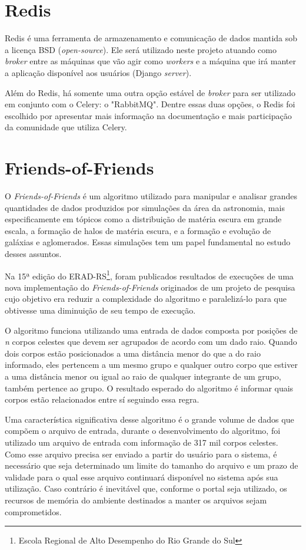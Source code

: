 \documentclass[tg]{mdtufsm}
\begin{document}
\section{Redis}
Redis \cite{redis} é uma ferramenta de armazenamento e comunicação de dados mantida sob a licença BSD (\emph{open-source}). Ele será utilizado neste projeto atuando como \emph{broker} entre as máquinas que vão agir como \emph{workers} e a máquina que irá manter a aplicação disponível aos usuários (Django \emph{server}). 

Além do Redis, há somente uma outra opção estável de \emph{broker} para ser utilizado em conjunto com o Celery: o "RabbitMQ". Dentre essas duas opções, o Redis foi escolhido por apresentar mais informação na documentação e mais participação da comunidade que utiliza Celery.

\section{Friends-of-Friends}
O \emph{Friends-of-Friends} \cite{friendsalg} é um algoritmo utilizado para manipular e analisar grandes quantidades de dados produzidos por simulações da área da astronomia, mais especificamente em tópicos como a distribuição de matéria escura em grande escala, a formação de halos de matéria escura, e a formação e evolução de galáxias e aglomerados. Essas simulações tem um papel fundamental no estudo desses assuntos.\cite{Bertschinger,Efstathiou}

Na 15ª edição do ERAD-RS\footnote{Escola Regional de Alto Desempenho do Rio Grande do Sul}, foram publicados resultados de execuções de uma nova implementação do \emph{Friends-of-Friends}\cite{friends} originados de um projeto de pesquisa cujo objetivo era reduzir a complexidade do algoritmo e paralelizá-lo para que obtivesse uma diminuição de seu tempo de execução.

O algoritmo funciona utilizando uma entrada de dados composta por posições de \emph{n} corpos celestes que devem ser agrupados de acordo com um dado raio. Quando dois corpos estão posicionados a uma distância menor do que a do raio informado, eles pertencem a um mesmo grupo e qualquer outro corpo que estiver a uma distância menor ou igual ao raio de qualquer integrante de um grupo, também pertence ao grupo. O resultado esperado do algoritmo é informar quais corpos estão relacionados entre sí seguindo essa regra.

Uma característica significativa desse algoritmo é o grande volume de dados que compõem o arquivo de entrada, durante o desenvolvimento do algoritmo, foi utilizado um arquivo de entrada com informação de 317 mil corpos celestes. Como esse arquivo precisa ser enviado a partir do usuário para o sistema, é necessário que seja determinado um limite do tamanho do arquivo e um prazo de validade para o qual esse arquivo continuará disponível no sistema após sua utilização. Caso contrário é inevitável que, conforme o portal seja utilizado, os recursos de memória do ambiente destinados a manter os arquivos sejam comprometidos.
\end{document}
